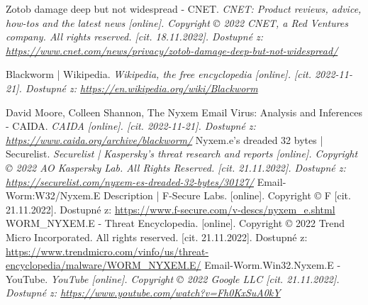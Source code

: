 \documentclass[a4paper,12pt]{article}
\begin{document}
{	
	{
		Zotob damage deep but not widespread - CNET. 
		\it{CNET: Product reviews, advice, how-tos and the latest news}
		[online]. Copyright © 2022 CNET, a Red Ventures company. All rights reserved. [cit. 18.11.2022].
		Dostupné z: \url{https://www.cnet.com/news/privacy/zotob-damage-deep-but-not-widespread/}
	}
	
	{
		Blackworm | Wikipedia.
		\it{Wikipedia, the free encyclopedia} [online]. [cit. 2022-11-21].
		Dostupné z: \url{https://en.wikipedia.org/wiki/Blackworm}
	}
	
	{
		David Moore, Colleen Shannon,
		The Nyxem Email Virus: Analysis and Inferences - CAIDA.
		\it{CAIDA} [online]. [cit. 2022-11-21].
		Dostupné z: \url{https://www.caida.org/archive/blackworm/}
	}
	{
		Nyxem.e’s dreaded 32 bytes | Securelist.
		\it{Securelist | Kaspersky’s threat research and reports} [online].
		Copyright © 2022 AO Kaspersky Lab. All Rights Reserved. [cit. 21.11.2022].
		Dostupné z: \url{https://securelist.com/nyxem-es-dreaded-32-bytes/30127/}
	}
	{
		Email-Worm:W32/Nyxem.E Description | F-Secure Labs.
		[online]. Copyright © F [cit. 21.11.2022].
		Dostupné z: \url{https://www.f-secure.com/v-descs/nyxem_e.shtml}
	}
	{
		WORM\_NYXEM.E - Threat Encyclopedia.
		[online]. Copyright © 2022 Trend Micro Incorporated. All rights reserved.
		[cit. 21.11.2022].
		Dostupné z: \url{https://www.trendmicro.com/vinfo/us/threat-encyclopedia/malware/WORM_NYXEM.E/}
	}
	{
		Email-Worm.Win32.Nyxem.E - YouTube.
		\it{YouTube} [online]. Copyright © 2022 Google LLC [cit. 21.11.2022].
		Dostupné z: \url{https://www.youtube.com/watch?v=Fh0KxSuA0kY}
	}
	
}
\end{document}
